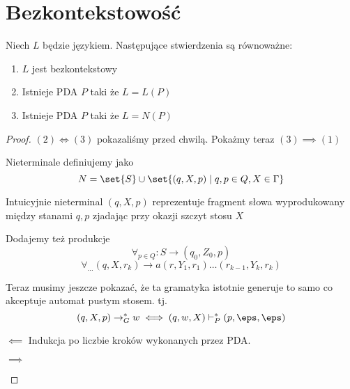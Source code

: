 \section{Bezkontekstowość}

\begin{theorem}
	Niech \( L \) będzie językiem. Następujące stwierdzenia są równoważne:
	\begin{enumerate}
		\item \( L \) jest bezkontekstowy
		\item Istnieje PDA \( P \) taki że \( L = L(P) \)
		\item Istnieje PDA \( P \) taki że \( L = N(P) \)
	\end{enumerate}
\end{theorem}
\begin{proof}
	\( (2) \iff (3) \) pokazaliśmy przed chwilą. Pokażmy teraz \( (3) \implies (1) \)

	Nieterminale definiujemy jako
	\[
		N = \set{S} \cup \set{(q, X, p) \mid q, p \in Q, X \in \Gamma }
	\]

	Intuicyjnie nieterminal \( (q, X, p) \) reprezentuje fragment słowa wyprodukowany między stanami \( q, p \) zjadając przy okazji szczyt stosu \( X \)

	Dodajemy też produkcje
	\[
		\forall_{p \in Q} : S \rightarrow (q_0, Z_0, p)
	\]
	\[
		\forall_{\dots} (q, X, r_k) \rightarrow a (r, Y_1, r_1) \dots ( r_{k-1}, Y_k, {r_k})
	\]

	Teraz musimy jeszcze pokazać, że ta gramatyka istotnie generuje to samo co akceptuje automat pustym stosem. tj.
	\[
		(q, X, p) \rightarrow_G^* w \iff (q, w, X) \vdash_P^* (p, \eps, \eps)
	\]
	\begin{description}
		\item \( \impliedby \)
		      Indukcja po liczbie kroków wykonanych przez PDA.


		\item \( \implies \)
	\end{description}

\end{proof}